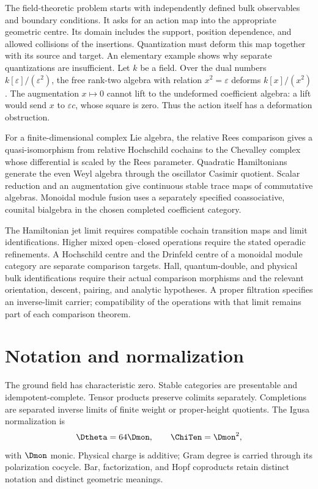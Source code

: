 \documentclass[11pt,twoside,openright]{memoir}
\begin{document}
The field-theoretic problem starts with independently defined bulk observables and boundary conditions. It asks for an action map into the appropriate geometric centre. Its domain includes the support, position dependence, and allowed collisions of the insertions. Quantization must deform this map together with its source and target. An elementary example shows why separate quantizations are insufficient. Let $k$ be a field. Over the dual numbers $k[\varepsilon]/(\varepsilon^2)$, the free rank-two algebra with relation $x^2=\varepsilon$ deforms $k[x]/(x^2)$. The augmentation $x\mapsto0$ cannot lift to the undeformed coefficient algebra: a lift would send $x$ to $\varepsilon c$, whose square is zero. Thus the action itself has a deformation obstruction.

For a finite-dimensional complex Lie algebra, the relative Rees comparison gives a quasi-isomorphism from relative Hochschild cochains to the Chevalley complex whose differential is scaled by the Rees parameter. Quadratic Hamiltonians generate the even Weyl algebra through the oscillator Casimir quotient. Scalar reduction and an augmentation give continuous stable trace maps of commutative algebras. Monoidal module fusion uses a separately specified coassociative, counital bialgebra in the chosen completed coefficient category.

The Hamiltonian jet limit requires compatible cochain transition maps and limit identifications. Higher mixed open--closed operations require the stated operadic refinements. A Hochschild centre and the Drinfeld centre of a monoidal module category are separate comparison targets. Hall, quantum-double, and physical bulk identifications require their actual comparison morphisms and the relevant orientation, descent, pairing, and analytic hypotheses. A proper filtration specifies an inverse-limit carrier; compatibility of the operations with that limit remains part of each comparison theorem.

\chapter*{Notation and normalization}
The ground field has characteristic zero.  Stable categories are presentable and idempotent-complete.  Tensor products preserve colimits separately.  Completions are separated inverse limits of finite weight or proper-height quotients.  The Igusa normalization is
\[
 \Dtheta=64\Dmon,\qquad \ChiTen=\Dmon^2,
\]
with $\Dmon$ monic.  Physical charge is additive; Gram degree is carried through its polarization cocycle.  Bar, factorization, and Hopf coproducts retain distinct notation and distinct geometric meanings.

\tableofcontents
\mainmatter







\backmatter


\end{document}
